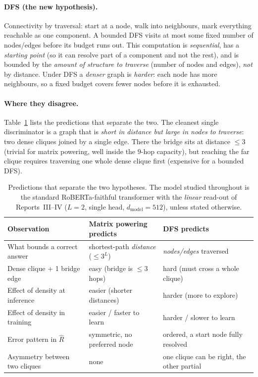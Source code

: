 \documentclass[11pt,a4paper]{article}
\begin{document}
\paragraph{DFS (the new hypothesis).} Connectivity by traversal: start at a node, walk into
neighbours, mark everything reachable as one component. A bounded DFS visits at most some fixed
number of nodes/edges before its budget runs out. This computation is \emph{sequential}, has a
\emph{starting point} (so it can resolve part of a component and not the rest), and is bounded
by the \emph{amount of structure to traverse} (number of nodes and edges), \emph{not} by
distance. Under DFS a \emph{denser} graph is \emph{harder}: each node has more neighbours, so a
fixed budget covers fewer nodes before it is exhausted.

\paragraph{Where they disagree.} Table~\ref{tab:predict} lists the predictions that separate
the two. The cleanest single discriminator is a graph that is \emph{short in distance but large
in nodes to traverse}: two dense cliques joined by a single edge. There the bridge sits at
distance $\le 3$ (trivial for matrix powering, well inside the $9$-hop capacity), but reaching
the far clique requires traversing one whole dense clique first (expensive for a bounded DFS).

\begin{table}[H]\centering\footnotesize\setlength{\tabcolsep}{4pt}
\begin{tabular}{lll}
\toprule
Observation & Matrix powering predicts & DFS predicts \\
\midrule
What bounds a correct answer & shortest-path \emph{distance} ($\le 3^L$) & \emph{nodes/edges} traversed \\
Dense clique + 1 bridge edge & easy (bridge is $\le 3$ hops) & hard (must cross a whole clique) \\
Effect of density at inference & easier (shorter distances) & harder (more to explore) \\
Effect of density in training & easier / faster to learn & harder / slower to learn \\
Error pattern in $\hat R$ & symmetric, no preferred node & ordered, a start node fully resolved \\
Asymmetry between two cliques & none & one clique can be right, the other partial \\
\bottomrule
\end{tabular}
\caption{Predictions that separate the two hypotheses. The model studied throughout is the
standard RoBERTa-faithful transformer with the \emph{linear} read-out of Reports~III--IV
($L=2$, single head, $d_{\mathrm{model}}=512$), unless stated otherwise.}
\label{tab:predict}
\end{table}
\end{document}
